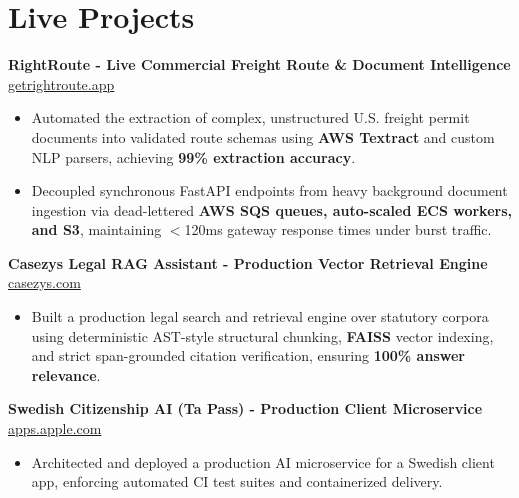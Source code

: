 \documentclass[9.5pt,a4paper]{article}
\begin{document}
\section*{Live Projects}
\noindent
\textbf{RightRoute - Live Commercial Freight Route \& Document Intelligence} \hfill \href{https://getrightroute.app}{getrightroute.app}
\begin{itemize}
    \item Automated the extraction of complex, unstructured U.S. freight permit documents into validated route schemas using \textbf{AWS Textract} and custom NLP parsers, achieving \textbf{99\% extraction accuracy}.
    \item Decoupled synchronous FastAPI endpoints from heavy background document ingestion via dead-lettered \textbf{AWS SQS queues, auto-scaled ECS workers, and S3}, maintaining $<$120ms gateway response times under burst traffic.
\end{itemize}
\vspace{0.6pt}
\noindent
\textbf{Casezys Legal RAG Assistant - Production Vector Retrieval Engine} \hfill \href{https://casezys.com}{casezys.com}
\begin{itemize}
    \item Built a production legal search and retrieval engine over statutory corpora using deterministic AST-style structural chunking, \textbf{FAISS} vector indexing, and strict span-grounded citation verification, ensuring \textbf{100\% answer relevance}.
\end{itemize}
\vspace{0.6pt}
\noindent
\textbf{Swedish Citizenship AI (Ta Pass) - Production Client Microservice} \hfill \href{https://apps.apple.com/us/app/ta-pass-swedish-citizenship/id6799644651}{apps.apple.com}
\begin{itemize}
    \item Architected and deployed a production AI microservice for a Swedish client app, enforcing automated CI test suites and containerized delivery.
\end{itemize}
\vspace{0.6pt}
\end{document}
